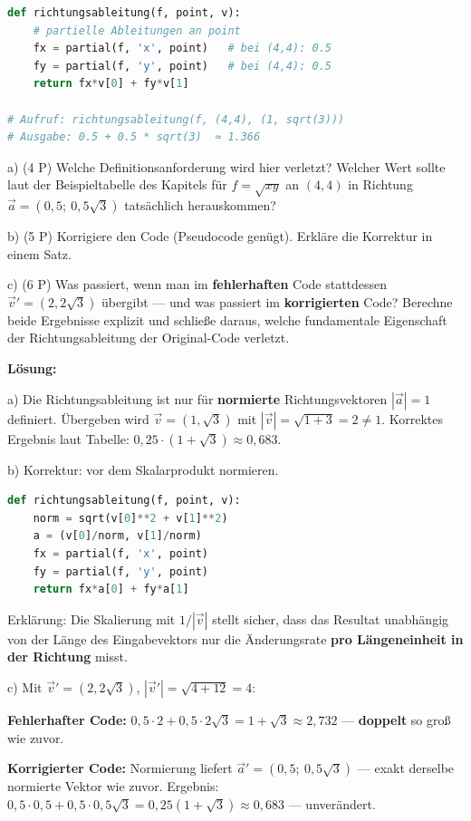 \documentclass[11pt, a4paper]{article}
\begin{document}
\begin{lstlisting}[language=python]
def richtungsableitung(f, point, v):
    # partielle Ableitungen an point
    fx = partial(f, 'x', point)   # bei (4,4): 0.5
    fy = partial(f, 'y', point)   # bei (4,4): 0.5
    return fx*v[0] + fy*v[1]

# Aufruf: richtungsableitung(f, (4,4), (1, sqrt(3)))
# Ausgabe: 0.5 + 0.5 * sqrt(3)  ≈ 1.366
\end{lstlisting}


a) (4 P) Welche Definitionsanforderung wird hier verletzt? Welcher Wert sollte laut der Beispieltabelle des Kapitels für $f=\sqrt{xy}$ an $(4,4)$ in Richtung $\vec{a}=(0{,}5;\ 0{,}5\sqrt{3})$ tatsächlich herauskommen?


b) (5 P) Korrigiere den Code (Pseudocode genügt). Erkläre die Korrektur in einem Satz.


c) (6 P) Was passiert, wenn man im \textbf{fehlerhaften} Code stattdessen $\vec{v}' = (2, 2\sqrt{3})$ übergibt — und was passiert im \textbf{korrigierten} Code? Berechne beide Ergebnisse explizit und schließe daraus, welche fundamentale Eigenschaft der Richtungsableitung der Original-Code verletzt.


\textbf{Lösung:}


a) Die Richtungsableitung ist nur für \textbf{normierte} Richtungsvektoren $|\vec{a}|=1$ definiert. Übergeben wird $\vec{v}=(1, \sqrt{3})$ mit $|\vec{v}|=\sqrt{1+3}=2 \neq 1$. Korrektes Ergebnis laut Tabelle: $0{,}25\cdot(1+\sqrt{3}) \approx 0{,}683$.


b) Korrektur: vor dem Skalarprodukt normieren.

\begin{lstlisting}[language=python]
def richtungsableitung(f, point, v):
    norm = sqrt(v[0]**2 + v[1]**2)
    a = (v[0]/norm, v[1]/norm)
    fx = partial(f, 'x', point)
    fy = partial(f, 'y', point)
    return fx*a[0] + fy*a[1]
\end{lstlisting}

Erklärung: Die Skalierung mit $1/|\vec{v}|$ stellt sicher, dass das Resultat unabhängig von der Länge des Eingabevektors nur die Änderungsrate \textbf{pro Längeneinheit in der Richtung} misst.


c) Mit $\vec{v}' = (2, 2\sqrt{3})$, $|\vec{v}'| = \sqrt{4+12} = 4$:


\textbf{Fehlerhafter Code:} $0{,}5\cdot 2 + 0{,}5\cdot 2\sqrt{3} = 1 + \sqrt{3} \approx 2{,}732$ — \textbf{doppelt} so groß wie zuvor.


\textbf{Korrigierter Code:} Normierung liefert $\vec{a}' = (0{,}5;\ 0{,}5\sqrt{3})$ — exakt derselbe normierte Vektor wie zuvor. Ergebnis: $0{,}5\cdot 0{,}5 + 0{,}5\cdot 0{,}5\sqrt{3} = 0{,}25(1+\sqrt{3}) \approx 0{,}683$ — unverändert.
\end{document}
